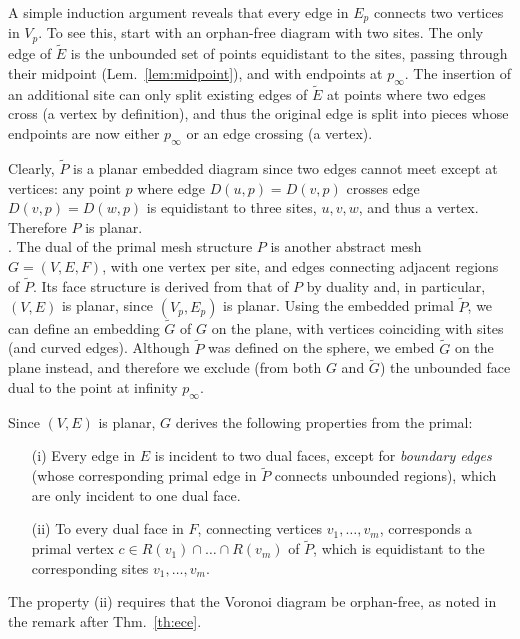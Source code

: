 \documentclass[11pt]{article}
\begin{document}
A simple induction argument reveals that every edge in $E_p$ connects two
vertices in $V_p$. 
To see this, start with an orphan-free diagram with two sites. The only edge
of $\tilde{E}$ is the unbounded set of points equidistant to the sites, passing through
their midpoint (Lem.~\ref{lem:midpoint}), and with endpoints at $p_\infty$. 
The insertion of an additional site can only split existing edges of
$\tilde{E}$ at points
where two edges cross (a vertex by definition), and thus the
original edge is split into pieces whose endpoints are now either $p_\infty$ or 
an edge crossing (a vertex). 



Clearly, $\tilde{P}$ is a planar embedded diagram since two edges cannot meet except at vertices:  
any point $p$ where edge $D(u,p)=D(v,p)$ crosses 
edge $D(v,p)=D(w,p)$ is equidistant to three sites, $u,v,w$, and thus a vertex. 
Therefore $P$ is planar. \\









.
The dual of the primal  mesh structure $P$ is another abstract 
mesh ${G}=(V,{E},F)$, with one vertex per site, 
and edges connecting adjacent regions of $\tilde{P}$. Its face structure is derived from that of $P$ by duality   and, in particular, $(V,E)$ is planar, since $(V_p,E_p)$ is planar. 
Using the embedded primal $\tilde{P}$, we can define an embedding $\tilde{G}$ of $G$ 
on the plane, with vertices coinciding with sites (and curved edges). 
Although $\tilde{P}$ was defined on the sphere, we embed $\tilde{G}$ on
the plane instead, and therefore we exclude (from both $G$ and $\tilde{G}$) the unbounded face dual to the point at infinity $p_\infty$. 

Since $(V,E)$ is planar, 
$G$ derives the following properties from the primal:
\begin{itemize}
\item[(i)]Every edge in $E$ is incident to two dual faces, 
except for \emph{boundary edges} (whose corresponding primal edge in
$\tilde{P}$ connects unbounded regions), which are only incident to one dual face. 
\item[(ii)]To every dual face in $F$, connecting vertices $v_1,\dots,v_m$, corresponds a
primal vertex $c\in R(v_1)\cap\dots\cap R(v_m)$ of $\tilde{P}$, 
which is equidistant to the corresponding sites $v_1,\dots,v_m$. 
\end{itemize}
The property (ii) requires that the Voronoi diagram be orphan-free, as noted in the remark after Thm.~\ref{th:ece}. 
\end{document}
